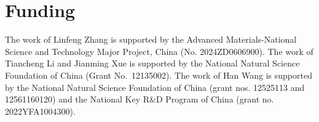 \section{Funding}

The work of Linfeng Zhang is supported by the Advanced Materials-National Science and Technology Major Project, China (No. 2024ZD0606900).
The work of Tiancheng Li and Jianming Xue is supported by the National Natural Science Foundation of China (Grant No.~12135002).
The work of Han Wang is supported by the National Natural Science Foundation of China (grant nos. 12525113 and 12561160120) and the National Key R\&D Program of China (grant no. 2022YFA1004300).
